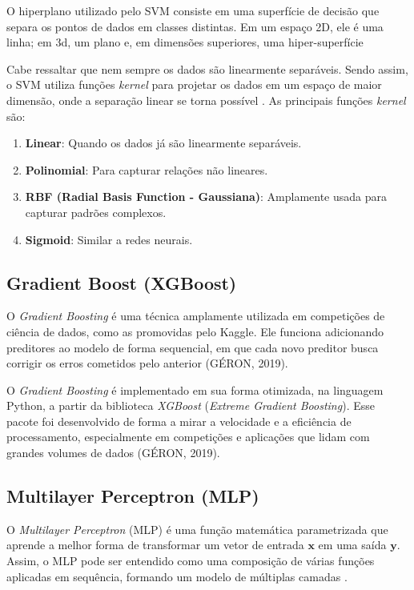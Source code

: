 O hiperplano utilizado pelo SVM consiste em uma superfície de decisão que separa os pontos de dados em classes distintas. Em um espaço 2D, ele é uma linha; em 3d, um plano e, em dimensões superiores, uma hiper-superfície \cite{noble2006}

Cabe ressaltar que nem sempre os dados são linearmente separáveis. Sendo assim, o SVM utiliza funções \textit{kernel} para projetar os dados em um espaço de maior dimensão, onde a separação linear se torna possível \cite{noble2006}. As principais funções \textit{kernel} são:

\begin{enumerate}
    \item \textbf{Linear}: Quando os dados já são linearmente separáveis.
    \item \textbf{Polinomial}: Para capturar relações não lineares.
    \item \textbf{RBF (Radial Basis Function - Gaussiana)}: Amplamente usada para capturar padrões complexos.
    \item \textbf{Sigmoid}: Similar a redes neurais.
\end{enumerate}

\subsection{Gradient Boost (XGBoost)}

O \textit{Gradient Boosting} é uma técnica amplamente utilizada em competições de ciência de dados, como as promovidas pelo Kaggle. Ele funciona adicionando preditores ao modelo de forma sequencial, em que cada novo preditor busca corrigir os erros cometidos pelo anterior (GÉRON, 2019). 

O \textit{Gradient Boosting} é implementado em sua forma otimizada, na linguagem Python, a partir da biblioteca \textit{XGBoost} (\textit{Extreme Gradient Boosting}). Esse pacote foi desenvolvido de forma a mirar a velocidade e a eficiência de processamento, especialmente em competições e aplicações que lidam com grandes volumes de dados (GÉRON, 2019). 


\subsection{Multilayer Perceptron (MLP)}

O \textit{Multilayer Perceptron} (MLP) é uma função matemática parametrizada que aprende a melhor forma de transformar um vetor de entrada \( \mathbf{x} \) em uma saída \( \mathbf{y} \). Assim, o MLP pode ser entendido como uma composição de várias funções aplicadas em sequência, formando um modelo de múltiplas camadas \cite{Goodfellow2016}.

